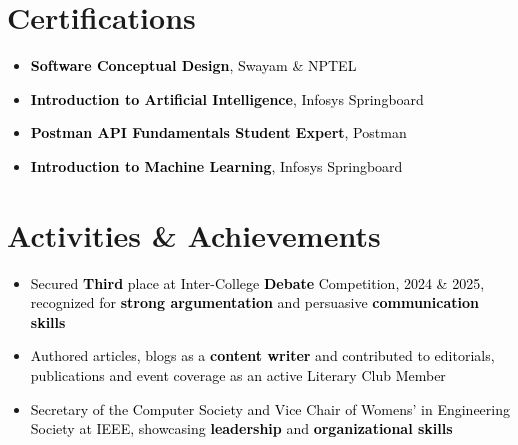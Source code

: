 \documentclass[a4paper,20pt]{article}
\begin{document}

\section{Certifications}
\vspace{5pt}
\begin{itemize}[label=\textbullet, labelsep=0.5em, left=0.5em, itemsep=-0.2em]
  \item \textcolor{black}{\textbf{Software Conceptual Design}, Swayam \& NPTEL}
  \item \textcolor{black}{\textbf{Introduction to Artificial Intelligence}, Infosys Springboard}
  \item \textcolor{black}{\textbf{Postman API Fundamentals Student Expert}, Postman}
  \item \textcolor{black}{\textbf{Introduction to Machine Learning}, Infosys Springboard}
\end{itemize}
\vspace{4pt}



\section{Activities \& Achievements}
\vspace{5pt}
\begin{itemize}[label=\textbullet, labelsep=0.5em, left=0.5em, itemsep=-0.2em]
  \item \textcolor{black}{Secured \textbf{Third} place at Inter-College \textbf{Debate} Competition, 2024 \& 2025, recognized for \textbf{strong argumentation} and persuasive \textbf{communication skills}}
  \item \textcolor{black}{Authored articles, blogs as a \textbf{content writer} and contributed to editorials, publications and event coverage as an active Literary Club Member}
  \item \textcolor{black}{Secretary of the Computer Society and Vice Chair of Womens' in Engineering Society at IEEE, showcasing \textbf{leadership} and \textbf{organizational skills}}
\end{itemize}
\end{document}
